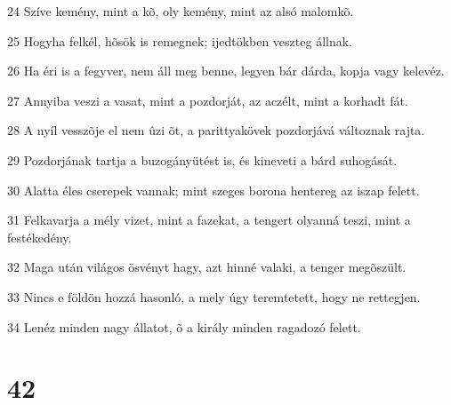 \par 24 Szíve kemény, mint a kõ, oly kemény, mint az alsó malomkõ.
\par 25 Hogyha felkél, hõsök is remegnek; ijedtökben veszteg állnak.
\par 26 Ha éri is a fegyver, nem áll meg benne, legyen bár dárda, kopja vagy kelevéz.
\par 27 Annyiba veszi a vasat, mint a pozdorját, az aczélt, mint a korhadt fát.
\par 28 A nyíl vesszõje el nem ûzi õt, a parittyakövek pozdorjává változnak rajta.
\par 29 Pozdorjának tartja a buzogányütést is, és kineveti a bárd suhogását.
\par 30 Alatta éles cserepek vannak; mint szeges borona hentereg az iszap felett.
\par 31 Felkavarja a mély vizet, mint a fazekat, a tengert olyanná teszi, mint a festékedény.
\par 32 Maga után világos ösvényt hagy, azt hinné valaki, a tenger megõszült.
\par 33 Nincs e földön hozzá hasonló, a mely úgy teremtetett, hogy ne rettegjen.
\par 34 Lenéz minden nagy állatot, õ a király minden ragadozó felett.

\chapter{42}

